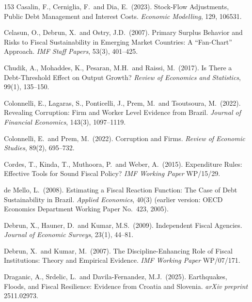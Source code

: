 \documentclass[11pt,a4paper]{article}
\begin{document}
\begin{thebibliography}{153}
 Casalin, F., Cerniglia, F.\ and Dia, E.\ (2023). Stock-Flow Adjustments, Public Debt Management and Interest Costs. \textit{Economic Modelling}, 129, 106531.

 Celasun, O., Debrun, X.\ and Ostry, J.D.\ (2007). Primary Surplus Behavior and Risks to Fiscal Sustainability in Emerging Market Countries: A ``Fan-Chart'' Approach. \textit{IMF Staff Papers}, 53(3), 401--425.

 Chudik, A., Mohaddes, K., Pesaran, M.H.\ and Raissi, M.\ (2017). Is There a Debt-Threshold Effect on Output Growth? \textit{Review of Economics and Statistics}, 99(1), 135--150.

 Colonnelli, E., Lagaras, S., Ponticelli, J., Prem, M.\ and Tsoutsoura, M.\ (2022). Revealing Corruption: Firm and Worker Level Evidence from Brazil. \textit{Journal of Financial Economics}, 143(3), 1097--1119.

 Colonnelli, E.\ and Prem, M.\ (2022). Corruption and Firms. \textit{Review of Economic Studies}, 89(2), 695--732.

 Cordes, T., Kinda, T., Muthoora, P.\ and Weber, A.\ (2015). Expenditure Rules: Effective Tools for Sound Fiscal Policy? \textit{IMF Working Paper} WP/15/29.

 de Mello, L.\ (2008). Estimating a Fiscal Reaction Function: The Case of Debt Sustainability in Brazil. \textit{Applied Economics}, 40(3) (earlier version: OECD Economics Department Working Paper No.\ 423, 2005).

 Debrun, X., Hauner, D.\ and Kumar, M.S.\ (2009). Independent Fiscal Agencies. \textit{Journal of Economic Surveys}, 23(1), 44--81.

 Debrun, X.\ and Kumar, M.\ (2007). The Discipline-Enhancing Role of Fiscal Institutions: Theory and Empirical Evidence. \textit{IMF Working Paper} WP/07/171.

 Draganic, A., Srdelic, L.\ and Davila-Fernandez, M.J.\ (2025). Earthquakes, Floods, and Fiscal Resilience: Evidence from Croatia and Slovenia. \textit{arXiv preprint} 2511.02973.


\end{thebibliography}
\end{document}
